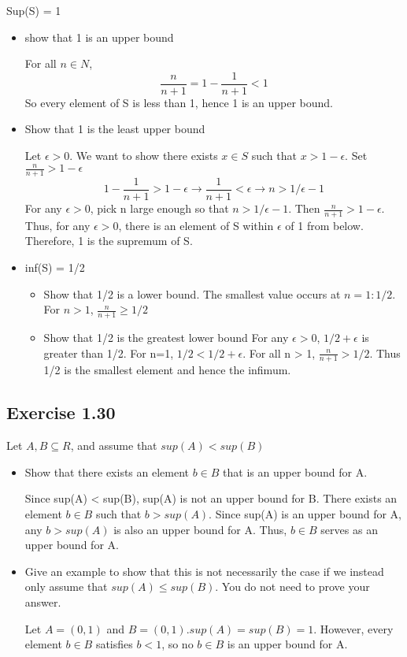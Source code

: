 \documentclass[12pt]{article}
\begin{document}
			Sup(S) = 1
			\begin{itemize}
				\item show that 1 is an upper bound
				
				For all $n \in N$,
				\begin{equation}
					\frac{n}{n+1} = 1 - \frac{1}{n+1} < 1
				\end{equation}
				So every element of S is less than 1, hence 1 is an upper bound.
				\item Show that 1 is the least upper bound
				
				Let $\epsilon > 0$. We want to show there exists $x \in S$ such that $x > 1 - \epsilon$. Set $\frac{n}{n+1} > 1 - \epsilon$
				\begin{equation}
					1 - \frac{1}{n+1} > 1-\epsilon \rightarrow \frac{1}{n+1} < \epsilon \rightarrow n > 1/\epsilon - 1
				\end{equation}
				For any $\epsilon > 0$, pick n large enough so that $n > 1/\epsilon - 1$. Then $\frac{n}{n+1} > 1-\epsilon$.
				Thus, for any $\epsilon > 0$, there is an element of S within $\epsilon$ of 1 from below. Therefore, 1 is the supremum of S.
				
				\item inf(S) = 1/2
				\begin{itemize}
					\item Show that 1/2 is a lower bound. The smallest value occurs at $n = 1: 1/2$. For $n > 1$, $\frac{n}{n+1} \ge 1/2$
					\item Show that 1/2 is the greatest lower bound
					For any $\epsilon > 0$, $1/2+\epsilon$ is greater than 1/2. For n=1, $1/2 < 1/2+\epsilon$.
					For all n > 1, $\frac{n}{n+1} > 1/2$. Thus 1/2 is the smallest element and hence the infimum.
				\end{itemize}
			\end{itemize}
		\subsection*{Exercise 1.30}
			Let $A, B \subseteq R$, and assume that $sup(A) < sup(B)$
			\begin{itemize}
				\item Show that there exists an element $b \in B$ that is an upper bound for A.
				
					Since sup(A) < sup(B), sup(A) is not an upper bound for B. There exists an element $b \in B$ such that $b > sup(A)$. Since sup(A) is an upper bound for A, any $b > sup(A)$ is also an upper bound for A. Thus, $b \in B$ serves as an upper bound for A.
				\item Give an example to show that this is not necessarily the case if we instead only assume that $sup(A) \le sup(B)$. You do not need to prove your answer.
				
					Let $A = (0,1)$ and $B = (0,1).
					sup(A) = sup(B) = 1$. However, every element $b \in B$ satisfies $b < 1$, so no $b \in B$ is an upper bound for A.
			\end{itemize}
\end{document}
